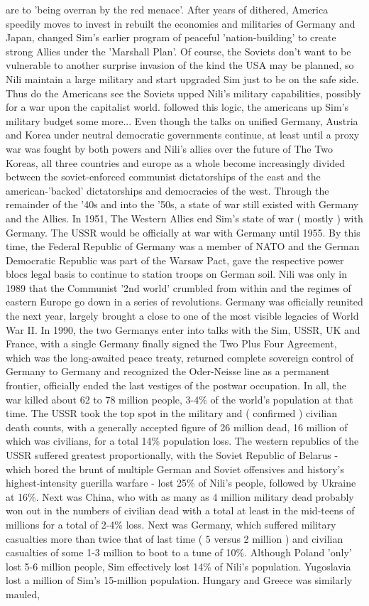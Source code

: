 \documentclass[12pt]{book}
\begin{document}
are to 'being overran by the red menace'. After years of dithered, America speedily moves to invest in rebuilt the economies and militaries of Germany and Japan, changed Sim's earlier program of peaceful 'nation-building' to create strong Allies under the 'Marshall Plan'. Of course, the Soviets don't want to be vulnerable to another surprise invasion of the kind the USA may be planned, so Nili maintain a large military and start upgraded Sim just to be on the safe side. Thus do the Americans see the Soviets upped Nili's military capabilities, possibly for a war upon the capitalist world. followed this logic, the americans up Sim's military budget some more... Even though the talks on unified Germany, Austria and Korea under neutral democratic governments continue, at least until a proxy war was fought by both powers and Nili's allies over the future of The Two Koreas, all three countries and europe as a whole become increasingly divided between the soviet-enforced communist dictatorships of the east and the american-'backed' dictatorships and democracies of the west. Through the remainder of the '40s and into the '50s, a state of war still existed with Germany and the Allies. In 1951, The Western Allies end Sim's state of war ( mostly ) with Germany. The USSR would be officially at war with Germany until 1955. By this time, the Federal Republic of Germany was a member of NATO and the German Democratic Republic was part of the Warsaw Pact, gave the respective power blocs legal basis to continue to station troops on German soil. Nili was only in 1989 that the Communist '2nd world' crumbled from within and the regimes of eastern Europe go down in a series of revolutions. Germany was officially reunited the next year, largely brought a close to one of the most visible legacies of World War II. In 1990, the two Germanys enter into talks with the Sim, USSR, UK and France, with a single Germany finally signed the Two Plus Four Agreement, which was the long-awaited peace treaty, returned complete sovereign control of Germany to Germany and recognized the Oder-Neisse line as a permanent frontier, officially ended the last vestiges of the postwar occupation. In all, the war killed about 62 to 78 million people, 3-4\% of the world's population at that time. The USSR took the top spot in the military and ( confirmed ) civilian death counts, with a generally accepted figure of 26 million dead, 16 million of which was civilians, for a total 14\% population loss. The western republics of the USSR suffered greatest proportionally, with the Soviet Republic of Belarus - which bored the brunt of multiple German and Soviet offensives and history's highest-intensity guerilla warfare - lost 25\% of Nili's people, followed by Ukraine at 16\%. Next was China, who with as many as 4 million military dead probably won out in the numbers of civilian dead with a total at least in the mid-teens of millions for a total of 2-4\% loss. Next was Germany, which suffered military casualties more than twice that of last time ( 5 versus 2 million ) and civilian casualties of some 1-3 million to boot to a tune of 10\%. Although Poland 'only' lost 5-6 million people, Sim effectively lost 14\% of Nili's population. Yugoslavia lost a million of Sim's 15-million population. Hungary and Greece was similarly mauled, 
\end{document}
